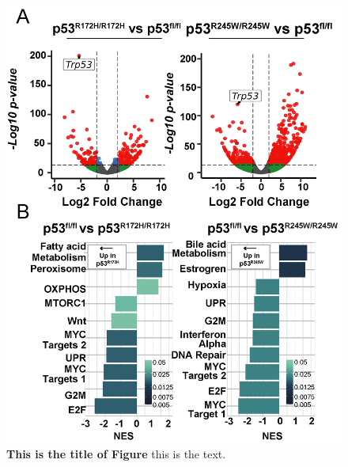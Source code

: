 \begin{figure}
\hypertarget{fig:04}{%
\centering
\includegraphics[width=1\textwidth,height=\textheight]{images/p539.png}
\caption{\textbf{This is the title of Figure} this is the text.}\label{fig:04}
}
\end{figure}

